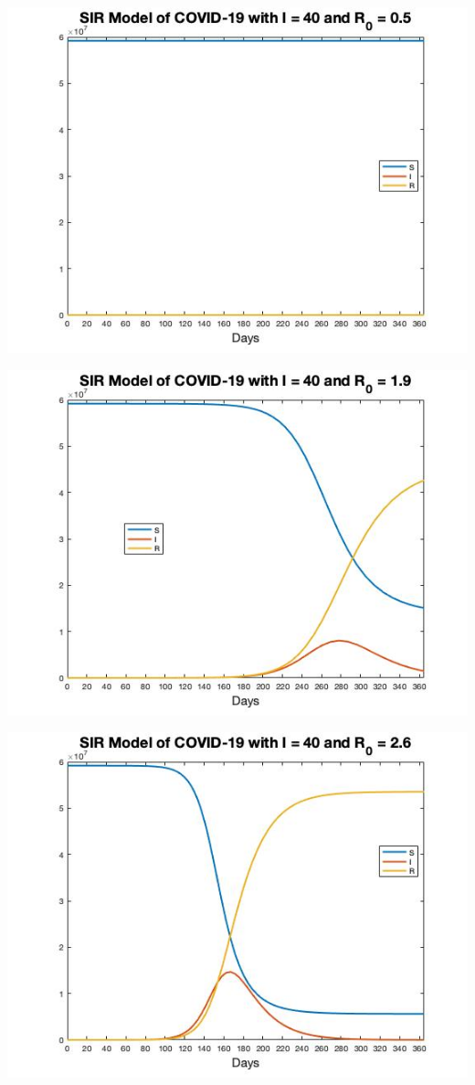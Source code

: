 \documentclass[12pt, a4paper]{article}
\begin{document}
        
    \includegraphics[scale=0.75]{plots/infect40(0.5).jpg}
        
        
    \includegraphics[scale=0.75]{plots/infect40(1.9).jpg}
        
    \includegraphics[scale=0.75]{plots/infect40(2.6).jpg}
        
\end{document}
